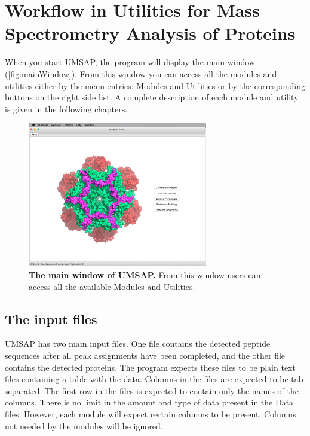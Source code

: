 \chapter{Workflow in Utilities for Mass Spectrometry Analysis of Proteins}
\label{chap:workflow}

When you start UMSAP, the program will display the main window (\autoref{fig:mainWindow}).
From this window you can access all the modules and utilities either by the menu
entries: Modules and Utilities or by the corresponding buttons on the right side
list. A complete description of each module and utility is given in the following
chapters.

\begin{figure}[h]
    \centering
    \includegraphics[width=0.7\textwidth]{./IMAGES/MAIN-WINDOW/mainwindow.jpg}
    \caption[The main window of UMSAP]{\textbf{The main window of UMSAP.} From
this window users can access all the available Modules and Utilities.}
    \label{fig:mainWindow}
    \vspace{-5pt}
\end{figure}

\section{The input files}
\label{sec:dataFile}

UMSAP has two main input files. One file contains the detected peptide sequences
after all peak assignments have been completed, and the other file contains the
detected proteins. The program expects these files to be plain text files containing
a table with the data. Columns in the files are expected to be tab separated. The
first row in the files is expected to contain only the names of the columns. There
is no limit in the amount and type of data present in the Data files. However, each
module will expect certain columns to be present. Columns not needed by the modules
will be ignored.

